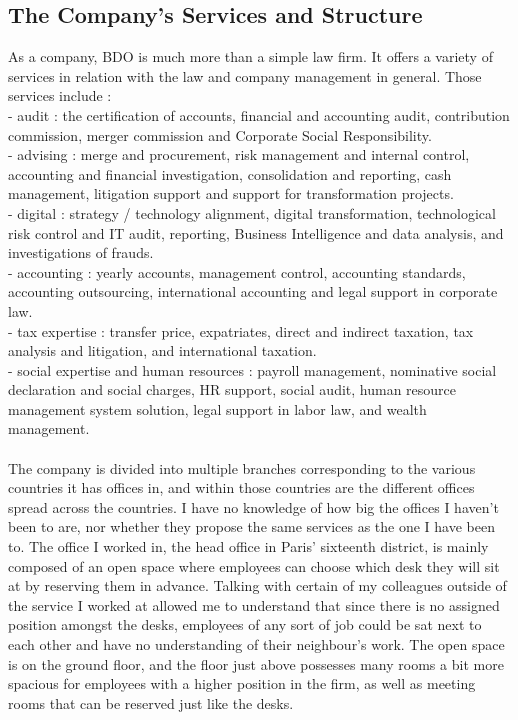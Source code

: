 \documentclass[12pt]{article}
\begin{document}
\subsection{The Company's Services and Structure}

As a company, BDO is much more than a simple law firm. It offers a variety of services in relation with the law and company management in general. Those services include : \\
- audit : the certification of accounts, financial and accounting audit, contribution commission, merger commission and Corporate Social Responsibility. \\
- advising : merge and procurement, risk management and internal control, accounting and financial investigation, consolidation and reporting, cash management, litigation support and support for transformation projects.\\
- digital : strategy / technology alignment, digital transformation, technological risk control and IT audit, reporting, Business Intelligence and data analysis, and investigations of frauds.\\
- accounting : yearly accounts, management control, accounting standards, accounting outsourcing, international accounting and legal support in corporate law.\\
- tax expertise : transfer price, expatriates, direct and indirect taxation, tax analysis and litigation, and international taxation.\\
- social expertise and human resources : payroll management, nominative social declaration and social charges, HR support, social audit, human resource management system solution, legal support in labor law, and wealth management.\\ \\
The company is divided into multiple branches corresponding to the various countries it has offices in, and within those countries are the different offices spread across the countries. I have no knowledge of how big the offices I haven't been to are, nor whether they propose the same services as the one I have been to. The office I worked in, the head office in Paris' sixteenth district, is mainly composed of an open space where employees can choose which desk they will sit at by reserving them in advance. Talking with certain of my colleagues outside of the service I worked at allowed me to understand that since there is no assigned position amongst the desks, employees of any sort of job could be sat next to each other and have no understanding of their neighbour's work. The open space is on the ground floor, and the floor just above possesses many rooms a bit more spacious for employees with a higher position in the firm, as well as meeting rooms that can be reserved just like the desks.  
\end{document}
